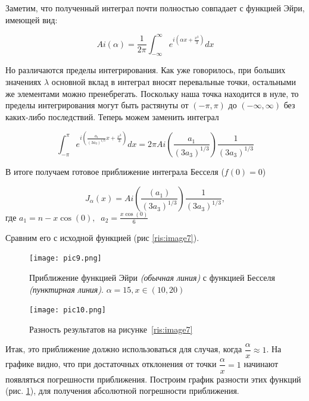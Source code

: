 \documentclass[14pt]{extarticle}
\begin{document}
Заметим, что полученный интеграл почти полностью совпадает с функцией Эйри, имеющей вид:

\begin{equation}\nonumber
Ai(\alpha) = \frac{1}{2\pi}\int_{-\infty}^{\infty}e^{i\left(\alpha x + \frac{x^3}{3}\right)}dx 
\end{equation}

Но различаются пределы интегрирования. Как уже говорилось, при больших значениях $\lambda$ основной вклад в интеграл вносят перевальные точки, остальными же элементами можно пренебрегать. Поскольку наша точка находится в нуле, то пределы интегрирования могут быть растянуты от $(-\pi, \pi)$ до $(-\infty, \infty)$ без каких-либо последствий. Теперь можем заменить интеграл 
  
\begin{equation}\nonumber
	\int_{-\pi}^{\pi}e^{i\left(\frac{a_1}{(3a_3)^{1/3}}x + \frac{x^3}{3}\right)}dx = 2\pi Ai\left(\frac{a_1}{(3 a_3)^{1/3}}\right) \frac{1}{(3 a_3)^{1/3}}
\end{equation}

В итоге получаем готовое приближение интеграла Бесселя ($f(0)=0$)

\begin{equation}\label{eq:eq19}
J_\alpha(x) = Ai\left(\frac{(a_1)}{(3 a_3)^{1/3}}\right) \frac{1}{(3 a_3)^{1/3}},
\end{equation}
где $a_1=n-x\cos(0), \;\; a_2=\frac{x\cos(0)}{6}$

Сравним его с исходной функцией (рис \ref{ris:image7}).

\begin{figure}[h]
\begin{center}
	\begin{minipage}[h]{0.45\linewidth}
		\texttt{[image: pic9.png]}
		\caption{Приближение функцией Эйри \textit{(обычная линия)} с функцией Бесселя \textit{(пунктирная линия)}. $\alpha=15, x \in (10, 20)$} %
		\label{ris:image7} %
	\end{minipage}
	\hfill 
	\begin{minipage}[h]{0.45\linewidth}
		\texttt{[image: pic10.png]}
			\caption{Разность результатов на рисунке~\ref{ris:image7}}
		\label{ris:image8}
	\end{minipage}
\end{center}
\end{figure}

Итак, это приближение должно использоваться для случая, когда $\dfrac{\alpha}{x} \approx 1$. На графике видно, что при достаточных отклонения от точки $\dfrac{\alpha}{x} =1$ начинают появляться погрешности приближения. Построим график разности этих функций (рис. \ref{ris:image8}), для получения абсолютной погрешности приближения.
\end{document}
